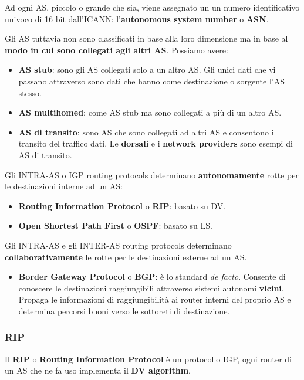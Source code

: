 \documentclass[11pt,a4paper,oneside]{book}
\theoremstyle{definition}
\begin{document}
Ad ogni AS, piccolo o grande che sia, viene assegnato un un numero identificativo univoco di 16 bit dall'ICANN: l'\textbf{autonomous system number} o \textbf{ASN}.

Gli AS tuttavia non sono classificati in base alla loro dimensione ma in base al \textbf{modo in cui sono collegati agli altri AS}. Possiamo avere:

\begin{itemize}
	\item \textbf{AS stub}: sono gli AS collegati solo a un altro AS. Gli unici dati che vi passano attraverso sono dati che hanno come destinazione o sorgente l'AS stesso.
	\item \textbf{AS multihomed}: come AS stub ma sono collegati a più di un altro AS.
	\item\textbf{ AS di transito}: sono AS che sono collegati ad altri AS e consentono il transito del traffico dati. Le \textbf{dorsali} e i \textbf{network providers} sono esempi di AS di transito.
\end{itemize}

Gli INTRA-AS o IGP routing protocols determinano \textbf{autonomamente} rotte per le
destinazioni interne ad un AS:

\begin{itemize}
	\item \textbf{Routing Information Protocol} o \textbf{RIP}: basato su DV.
	\item \textbf{Open Shortest Path First} o \textbf{OSPF}: basato su LS.
\end{itemize}

Gli INTRA-AS e gli INTER-AS routing protocols determinano \textbf{collaborativamente} le rotte per le destinazioni esterne ad un AS.

\begin{itemize}
	\item \textbf{Border Gateway Protocol} o \textbf{BGP}: è lo standard \textit{de facto}. Consente di conoscere le destinazioni raggiungibili attraverso sistemi
	      autonomi \textbf{vicini}. Propaga le informazioni di raggiungibilità ai router interni del proprio AS e determina percorsi buoni verso le sottoreti di destinazione.
\end{itemize}

\pagebreak

\subsubsection{RIP}
Il \textbf{RIP} o \textbf{Routing Information Protocol} è un protocollo IGP, ogni router di un AS che ne fa uso implementa il \textbf{DV algorithm}.
\end{document}
